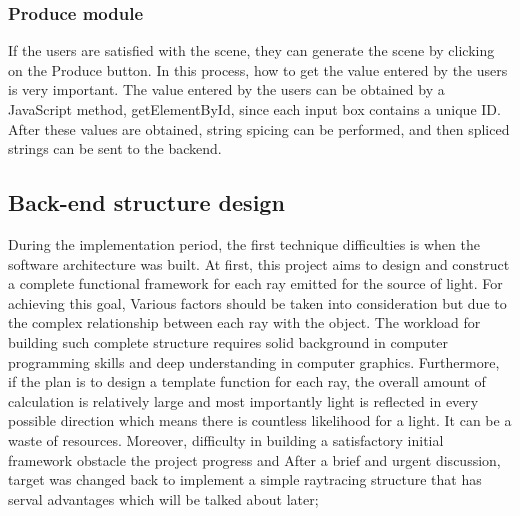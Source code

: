 \documentclass[11pt]{article}
\begin{document}
\subsubsection{Produce module}
If the users are satisfied with the scene, they can generate the scene by clicking on the Produce button. In this process, how to get the value entered by the users is very important. The value entered by the users can be obtained by a JavaScript method, getElementById, since each input box contains a unique ID. After these values are obtained, string spicing can be performed, and then spliced strings can be sent to the backend.

\subsection{Back-end structure design}
During the implementation period, the first technique difficulties is when the software architecture was built. At first, this project aims to design and construct a complete functional framework for each ray emitted for the source of light. For achieving this goal, Various factors should be taken into consideration but due to the complex relationship between each ray with the object. The workload for building such complete structure requires solid background in computer programming skills and deep understanding in computer graphics. Furthermore, if the plan is to design a template function for each ray, the overall amount of calculation is relatively large and most importantly light is reflected in every possible direction which means there is countless likelihood for a light. It can be a waste of resources. Moreover, difficulty in building a satisfactory initial framework obstacle the project progress and After a brief and urgent discussion, target was changed back to implement a simple raytracing structure that has serval advantages which will be talked about later;
\end{document}
